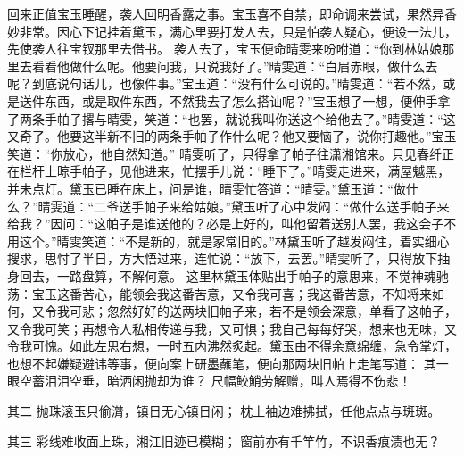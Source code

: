 \documentclass[12pt,oneside]{book}
\begin{document}
回来正值宝玉睡醒，袭人回明香露之事。宝玉喜不自禁，即命调来尝试，果然异香妙非常。因心下记挂着黛玉，满心里要打发人去，只是怕袭人疑心，便设一法儿，先使袭人往宝钗那里去借书。
袭人去了，宝玉便命晴雯来吩咐道：“你到林姑娘那里去看看他做什么呢。他要问我，只说我好了。”晴雯道：“白眉赤眼，做什么去呢？到底说句话儿，也像件事。”宝玉道：“没有什么可说的。”晴雯道：“若不然，或是送件东西，或是取件东西，不然我去了怎么搭讪呢？”宝玉想了一想，便伸手拿了两条手帕子撂与晴雯，笑道：“也罢，就说我叫你送这个给他去了。”晴雯道：“这又奇了。他要这半新不旧的两条手帕子作什么呢？他又要恼了，说你打趣他。”宝玉笑道：“你放心，他自然知道。”
晴雯听了，只得拿了帕子往潇湘馆来。只见春纤正在栏杆上晾手帕子，见他进来，忙摆手儿说：“睡下了。”晴雯走进来，满屋魆黑，并未点灯。黛玉已睡在床上，问是谁，晴雯忙答道：“晴雯。”黛玉道：“做什么？”晴雯道：“二爷送手帕子来给姑娘。”黛玉听了心中发闷：“做什么送手帕子来给我？”因问：“这帕子是谁送他的？必是上好的，叫他留着送别人罢，我这会子不用这个。”晴雯笑道：“不是新的，就是家常旧的。”林黛玉听了越发闷住，着实细心搜求，思忖了半日，方大悟过来，连忙说：“放下，去罢。”晴雯听了，只得放下抽身回去，一路盘算，不解何意。
这里林黛玉体贴出手帕子的意思来，不觉神魂驰荡：宝玉这番苦心，能领会我这番苦意，又令我可喜；我这番苦意，不知将来如何，又令我可悲；忽然好好的送两块旧帕子来，若不是领会深意，单看了这帕子，又令我可笑；再想令人私相传递与我，又可惧；我自己每每好哭，想来也无味，又令我可愧。如此左思右想，一时五内沸然炙起。黛玉由不得余意绵缠，急令掌灯，也想不起嫌疑避讳等事，便向案上研墨蘸笔，便向那两块旧帕上走笔写道：
其一
眼空蓄泪泪空垂，暗洒闲抛却为谁？
尺幅鲛鮹劳解赠，叫人焉得不伤悲！

其二
抛珠滚玉只偷潸，镇日无心镇日闲；
枕上袖边难拂拭，任他点点与斑斑。

其三
彩线难收面上珠，湘江旧迹已模糊；
窗前亦有千竿竹，不识香痕渍也无？
\end{document}
